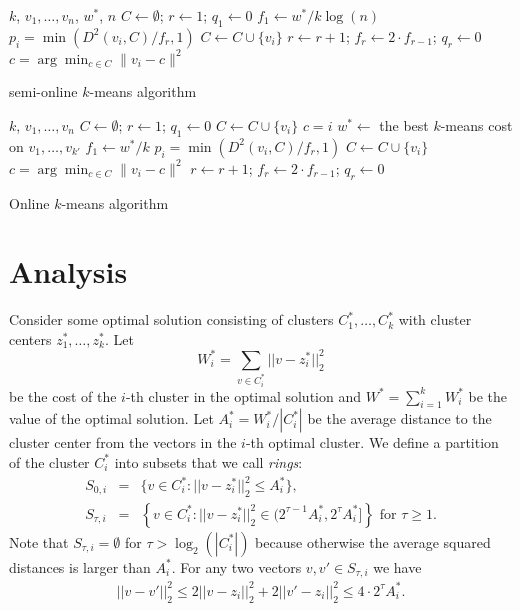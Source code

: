 \documentclass[11pt,twoside]{article}
\def\tab{\hspace{5mm}}
\begin{document}
\begin{algorithm}
\begin{algorithmic}
 $k$, $v_1,\ldots,v_n$, $w^*$, $n$
\STATE $C \gets \emptyset$;\;\; $r \gets 1$;\;\; $q_1 \gets 0$ 
\STATE $f_1 \gets w^*/k\log(n)$
	 $p_i = \min(D^2(v_i, C)/f_r,1)$
	\STATE \tab $C \gets C \cup \{v_i\}$
		\STATE $r \gets r+1$;\;\;  $f_r \gets 2\cdot f_{r-1}$;\;\; $q_r \gets 0$
	\ENDIF
	 $c = \arg\min_{c \in C}\|v_i - c\|^2$
\ENDFOR
\caption{semi-online $k$-means algorithm}\label{alg3}
\end{algorithmic}
\end{algorithm}

\begin{algorithm}
\begin{algorithmic}
 $k$, $v_1,\ldots,v_n$
\STATE $C \gets \emptyset$;\;\; $r \gets 1$;\;\; $q_1 \gets 0$ 
	\STATE $C \gets C \cup \{v_i\}$
	 $c = i$
\ENDFOR
\STATE $w^{*} \gets$ the best $k$-means cost on $v_1,\ldots,v_{k'}$
\STATE $f_1 \gets  w^{*}/k$
	 $p_i = \min(D^2(v_i, C)/f_r,1)$
	\STATE \tab $C \gets C \cup \{v_i\}$
	 $c = \arg\min_{c \in C}\|v_i - c\|^2$
		\STATE $r \gets r+1$;\;\;  $f_r \gets 2\cdot f_{r-1}$;\;\; $q_r \gets 0$
	\ENDIF
\ENDFOR
\caption{Online $k$-means algorithm}\label{alg1}
\end{algorithmic}
\end{algorithm}

 



\section{Analysis}\label{analysis}
Consider some optimal solution consisting of clusters $C_1^*,\dots,C^*_k$ with cluster centers $z_1^*,\dots,z^*_k$. Let
$$W^*_i=\sum_{v\in C^*_i} ||v-z_i^*||_2^2$$
be the cost of the $i$-th cluster in the optimal solution and 
 $W^*=\sum_{i=1}^kW^*_i$ be the value of the optimal solution. 
Let $A^*_i=W^*_i/|C^*_i|$ be the average distance to the cluster center from the vectors in the $i$-th optimal cluster. 
We define a partition of the cluster $C_i^*$ into subsets that we call {\it rings}: 
\begin{eqnarray}
S_{0,i}&=&\{v\in C^*_i: ||v-z^*_i||^2_2\le A^*_i\},\\
S_{\tau,i}&=&\left\{v\in C^*_i: ||v-z^*_i||^2_2\in ( 2^{\tau-1}A^*_i,2^{\tau}A^*_i]\right\} \mbox{ for }\tau\ge 1.
\end{eqnarray}
Note that $S_{\tau,i}=\emptyset $  for $\tau > \log_2 (|C_i^*|)$ because otherwise the average squared distances is larger than $A^*_i$.
For any two vectors $v,v'\in S_{\tau,i}$  we have 
\begin{eqnarray}\label{triangleInequality}
||v-v'||^2_2\le 2 ||v-z_i||^2_2+2||v'-z_i||^2_2\le 4\cdot 2^{\tau}A^*_i.
\end{eqnarray}
\end{document}

